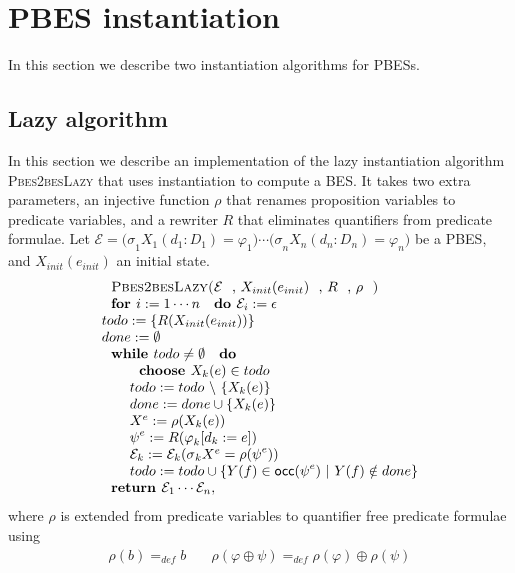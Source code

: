 \documentclass{article}
\begin{document}
\section{PBES instantiation}

In this section we describe two instantiation algorithms for PBESs.

\subsection{\protect\bigskip Lazy algorithm}

In this section we describe an implementation of the lazy instantiation
algorithm \textsc{Pbes2besLazy} that uses instantiation to compute a BES. It
takes two extra parameters, an injective function $\rho $ that renames
proposition variables to predicate variables, and a rewriter $R$ that
eliminates quantifiers from predicate formulae. Let $\mathcal{E=(\sigma }%
_{1}X_{1}(d_{1}:D_{1})=\varphi _{1})\cdots \mathcal{(\sigma }%
_{n}X_{n}(d_{n}:D_{n})=\varphi _{n})$ be a PBES, and $X_{init}(e_{init})$ an
initial state.%
\begin{equation*}
\begin{array}{l}
\text{\textsc{Pbes2besLazy(}}\mathcal{E}\text{, }X_{init}(e_{init})\text{, }R%
\text{, }\rho \text{\textsc{)}} \\ 
\text{\textbf{for }}i:=1\cdots n\text{ \textbf{do }}\mathcal{E}%
_{i}:=\epsilon  \\ 
todo:=\{R(X_{init}(e_{init}))\} \\ 
done:=\emptyset  \\ 
\text{\textbf{while }}todo\neq \emptyset \text{ \textbf{do}} \\ 
\qquad \text{\textbf{choose }}X_{k}(e)\in todo \\ 
\qquad todo:=todo\ \backslash \ \{X_{k}(e)\} \\ 
\qquad done:=done\cup \{X_{k}(e)\} \\ 
\qquad X^{e}:=\rho (X_{k}(e)) \\ 
\qquad \psi ^{e}:=R(\varphi _{k}[d_{k}:=e]) \\ 
\qquad \mathcal{E}_{k}:=\mathcal{E}_{k}(\mathcal{\sigma }_{k}X^{e}=\rho
(\psi ^{e})) \\ 
\qquad todo:=todo\cup \{Y(f)\in \mathsf{occ}(\psi ^{e})\ |\ Y(f)\notin done\}
\\ 
\text{\textbf{return }}\mathcal{E}_{1}\cdots \mathcal{E}_{n},%
\end{array}%
\end{equation*}%
where $\rho $ is extended from predicate variables to quantifier free
predicate formulae using%
\begin{equation*}
\begin{array}{cc}
\rho (b)=_{def}b & \quad \rho (\varphi \oplus \psi )=_{def}\rho (\varphi
)\oplus \rho (\psi )%
\end{array}%
\end{equation*}%
\pagebreak 
\end{document}
